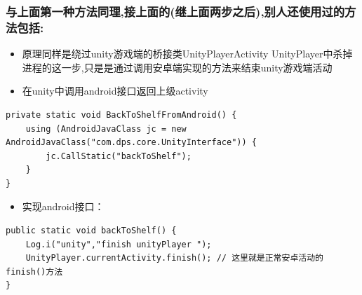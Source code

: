 \documentclass[9pt, b5paper]{article}
\begin{document}
\subsubsection{与上面第一种方法同理,接上面的(继上面两步之后),别人还使用过的方法包括:}
\label{sec-1-2-3}
\begin{itemize}
\item 原理同样是绕过unity游戏端的桥接类UnityPlayerActivity UnityPlayer中杀掉进程的这一步,只是是通过调用安卓端实现的方法来结束unity游戏端活动
\item 在unity中调用android接口返回上级activity
\end{itemize}
\begin{verbatim}
private static void BackToShelfFromAndroid() {
    using (AndroidJavaClass jc = new AndroidJavaClass("com.dps.core.UnityInterface")) {
        jc.CallStatic("backToShelf");
    }
}
\end{verbatim}
\begin{itemize}
\item 实现android接口：
\end{itemize}
\begin{verbatim}
public static void backToShelf() {
    Log.i("unity","finish unityPlayer ");
    UnityPlayer.currentActivity.finish(); // 这里就是正常安卓活动的finish()方法
}
\end{verbatim}
\end{document}
